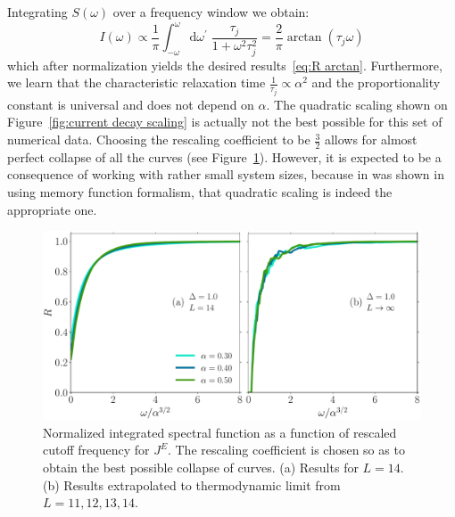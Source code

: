 Integrating \(S(\omega)\) over a frequency window we obtain:
\begin{equation*}
  I(\omega) \propto \frac{1}{\pi}\int_{-\omega}^{\omega}\mathrm{d}\omega^{\prime}\; 
  \frac{\tau_{j}}{1+\omega^2\tau_{j}^2} = \frac{2}{\pi} \arctan(\tau_{j} \omega)
\end{equation*}
which after normalization yields the desired results~\eqref{eq:R arctan}. Furthermore, we learn that the 
characteristic relaxation time \(\frac{1}{\tau_{j}} \propto \alpha^2\) and the proportionality
constant is universal and does not depend on \(\alpha\).
The quadratic scaling shown on Figure~\ref{fig:current decay scaling} is actually not the
best possible for this set of numerical data. Choosing the rescaling coefficient to be
\(\frac{3}{2}\) allows for almost perfect collapse of all the curves 
(see Figure~\ref{fig:current decay perfect scaling}). However, it is expected to be a consequence
of working with rather small system sizes, because in was shown 
in~\textcite{Mierzejewski2015Approx} using memory function formalism, that quadratic scaling
is indeed the appropriate one.
\begin{figure}[ht]
  \centering
  \includegraphics[width=\figsize\textwidth]{Figures/current_perfect_scaling.pdf}
  \caption{Normalized integrated spectral function as a function of 
  rescaled cutoff frequency for \(J^E\). The rescaling coefficient is chosen so as to obtain the 
  best possible collapse of curves. (a) Results for \(L=14\). (b) Results extrapolated
   to thermodynamic limit from \(L=11,12,13,14\).}\label{fig:current decay perfect scaling}
\end{figure}


